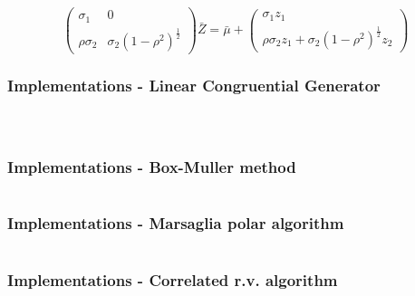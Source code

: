 \documentclass[10pt, serif, mathserif]{beamer}
\begin{document}
\begin{frame}
\begin{enumerate}
\[          \left(\begin{matrix} \sigma_1 & 0 \\ \rho\sigma_2 & \sigma_2(1-\rho^2)^{\frac{1}{2}} \end{matrix} \right)
          \bar{Z} = 
        \bar{\mu} + %
          \left(\begin{matrix} \sigma_1 z_1 \\ \rho\sigma_2z_1+\sigma_2(1-\rho^2)^\frac{1}{2}z_2 \end{matrix} \right)
      \]
  \end{enumerate}
\end{frame}

\begin{frame}
	\frametitle{Implementations - Linear Congruential Generator}
	\begin{columns}[t]
		\begin{column}{5cm}
      \inputminted[fontsize=\small,linenos]{matlab}{matlab/LCG.m}
		\end{column}
		\begin{column}{5cm}
      \inputminted[fontsize=\small,linenos,firstnumber=14]{matlab}{matlab/LCGstep.m}
		\end{column}
	\end{columns}
\end{frame}

\begin{frame}
	\frametitle{Implementations - Box-Muller method}
  \inputminted[fontsize=\small,linenos]{matlab}{matlab/BoxMuller.m}
\end{frame}

\begin{frame}
	\frametitle{Implementations - Marsaglia polar algorithm}
  \inputminted[fontsize=\small,linenos]{matlab}{matlab/Marsaglia.m}
\end{frame}

\begin{frame}
	\frametitle{Implementations - Correlated r.v. algorithm}
  \inputminted[fontsize=\small,linenos]{matlab}{matlab/CorrelatedRV.m}
\end{frame}
\end{document}
